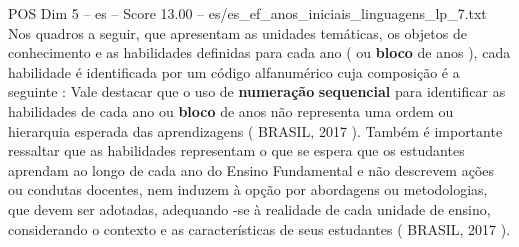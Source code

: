 \begin{textsample}{POS Dim 5 – es – Score 13.00 – es/es\_ef\_anos\_iniciais\_linguagens\_lp\_7.txt}
Nos quadros a seguir, que apresentam as unidades temáticas, os objetos de conhecimento e as habilidades definidas para cada ano ( ou \textbf{bloco} de anos ), cada habilidade é identificada por um código alfanumérico cuja composição é a seguinte : Vale destacar que o uso de \textbf{numeração} \textbf{sequencial} para identificar as habilidades de cada ano ou \textbf{bloco} de anos não representa uma ordem ou hierarquia esperada das aprendizagens ( BRASIL, 2017 ).
Também é importante ressaltar que as habilidades representam o que se espera que os estudantes aprendam ao longo de cada ano do Ensino Fundamental e não descrevem ações ou condutas docentes, nem induzem à opção por abordagens ou metodologias, que devem ser adotadas, adequando -se à realidade de cada unidade de ensino, considerando o contexto e as características de seus estudantes ( BRASIL, 2017 ).

\end{textsample}
